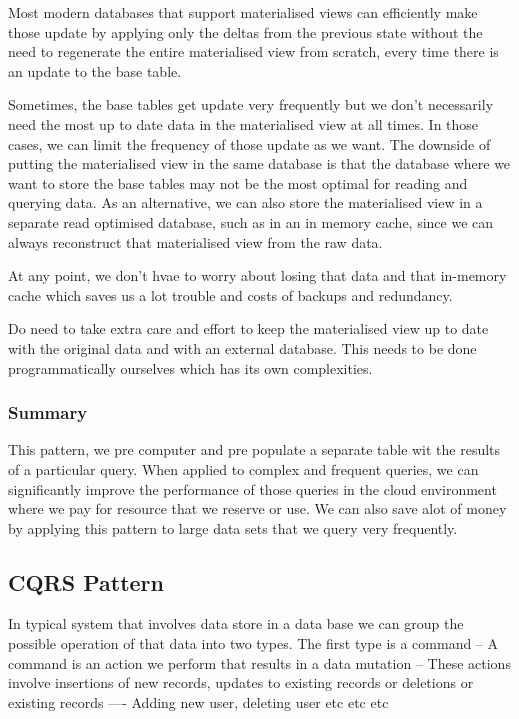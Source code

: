 \documentclass[a4paper, 11pt]{book}
\begin{document}
    Most modern databases that support materialised views can efficiently make those update by applying only the deltas from the previous state without the need to regenerate the entire materialised view from scratch, every time there is an update to the base table.

    Sometimes, the base tables get update very frequently but we don't necessarily need the most up to date data in the materialised view at all times.
    In those cases, we can limit the frequency of those update as we want.
    The downside of putting the materialised view in the same database is that the database where we want to store the base tables may not be the most optimal for reading and querying data.
    As an alternative, we can also store the materialised view in a separate read optimised database, such as in an in memory cache, since we can always reconstruct that materialised view from the raw data.

    At any point, we don't hvae to worry about losing that data and that in-memory cache which saves us a lot trouble and costs of backups and redundancy.

    Do need to take extra care and effort to keep the materialised view up to date with the original data and with an external database.
    This needs to be done programmatically ourselves which has its own complexities.

    \subsubsection{Summary}
    This pattern, we pre computer and pre populate a separate table wit the results of a particular query.
    When applied to complex and frequent queries, we can significantly improve the performance of those queries in the cloud environment where we pay for resource that we reserve or use.
    We can also save alot of money by applying this pattern to large data sets that we query very frequently.

    \subsection{CQRS Pattern}
    In typical system that involves data store in a data base we can group the possible operation of that data into two types.
    The first type is a command
    -- A command is an action we perform that results in a data mutation
    -- These actions involve insertions of new records, updates to existing records or deletions or existing records
    ---- Adding new user, deleting user etc etc etc
\end{document}

